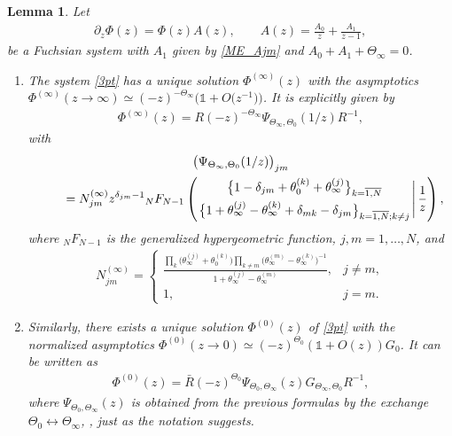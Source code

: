 \documentclass[pdftex]{sigma}
\numberwithin{equation}{section}
\newtheorem{Lemma}[Theorem]{Lemma}
\begin{document}
\begin{Lemma}\label{lemmahyp}Let
\begin{gather}\label{3pt}
\partial_z\Phi(z) = \Phi(z) A(z),\qquad A(z) =\frac{ A_0}{z}+\frac{A_1}{z-1},
\end{gather}
be a Fuchsian system with $ A_1$ given by \eqref{ME_Ajm} and $A_0+ A_1+\Theta_{\infty}=0$.
\begin{enumerate}\itemsep=0pt
\item[$1.$] The system \eqref{3pt} has a unique solution $\Phi^{(\infty)}(z)$ with the asymptotics $\Phi^{(\infty)}(z\to\infty)\simeq(-z)^{-\Theta_\infty}\big(\mathds 1+O\big(z^{-1}\big)\big)$. It is explicitly given by
\begin{gather*}
\Phi^{(\infty)}(z)=R(-z)^{-\Theta_\infty} \Psi_{\Theta_{\infty},\Theta_0}(1/z) R^{-1},
\end{gather*}
with
\begin{gather}
\big(\Psi_{\Theta_{\infty},\Theta_0}(1/z)\big)_{jm}\nonumber\\
\qquad{} = N^{(\infty)}_{jm} z^{\delta_{jm}-1}
{}_NF_{N-1}\left(\genfrac{}{}{0pt}{0}{\bigl\{1-\delta_{jm}+\theta^{(k)}_0+\theta^{(j)}_\infty\bigr\}_{k=\overline{1,N}} }
{\bigl\{1+\theta^{(j)}_\infty-\theta^{(k)}_\infty
+\delta_{mk}-\delta_{jm}\bigr\}_{k=\overline{1,N};k\ne j}}\Bigg|\,\frac{1}{z}\right),\label{hyperg}
\end{gather}
where $_NF_{N-1}$ is the generalized hypergeometric function, $j,m=1,\ldots,N$, and
\begin{gather*}
N^{(\infty)}_{jm}=\begin{cases}\displaystyle\frac{\prod\limits_{k}\big(\theta^{(j)}_\infty+\theta^{(k)}_0\big) \prod\limits_{k\ne m}\big(\theta^{(m)}_\infty-\theta^{(k)}_\infty\big)^{-1}}{1+\theta^{(j)}_\infty-\theta^{(m)}_\infty},& j\ne m,\\
1, & j=m.
\end{cases}
\end{gather*}
\item[$2.$] Similarly, there exists a unique solution $\Phi^{(0)}(z)$ of \eqref{3pt} with the normalized asymptotics $\Phi^{(0)}(z\to 0) \simeq (-z)^{\Theta_0}(\mathds 1+O(z)) G_0$. It can be written as
\begin{gather*}
\Phi^{(0)}(z) = \bar R(-z)^{\Theta_0}\Psi_{\Theta_0,\Theta_{\infty}}(z) G_{\Theta_\infty,\Theta_0} {R}^{-1},
\end{gather*}
where $\Psi_{\Theta_0,\Theta_{\infty}}(z)$ is obtained from the previous formulas by the exchange $\Theta_0\leftrightarrow\Theta_{\infty}$, , just as the notation suggests.

\end{enumerate}
\end{Lemma}
\end{document}
